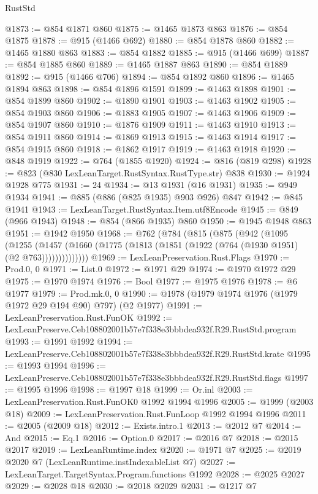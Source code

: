 \begin{lexlean}{RustStd}
\begin{coremodule}
@1873 := @854 @1871 @860
@1875 := @1465 @1873 @863
@1876 := @854 @1875
@1878 := @915 (@1466 @692)
@1880 := @854 @1878 @860
@1882 := @1465 @1880 @863
@1883 := @854 @1882
@1885 := @915 (@1466 @699)
@1887 := @854 @1885 @860
@1889 := @1465 @1887 @863
@1890 := @854 @1889
@1892 := @915 (@1466 @706)
@1894 := @854 @1892 @860
@1896 := @1465 @1894 @863
@1898 := @854 @1896 @1591
@1899 := @1463 @1898
@1901 := @854 @1899 @860
@1902 := @1890 @1901
@1903 := @1463 @1902
@1905 := @854 @1903 @860
@1906 := @1883 @1905
@1907 := @1463 @1906
@1909 := @854 @1907 @860
@1910 := @1876 @1909
@1911 := @1463 @1910
@1913 := @854 @1911 @860
@1914 := @1869 @1913
@1915 := @1463 @1914
@1917 := @854 @1915 @860
@1918 := @1862 @1917
@1919 := @1463 @1918
@1920 := @848 @1919
@1922 := @764 (@1855 @1920)
@1924 := @816 (@819 @298)
@1928 := @823 (@830 LexLeanTarget.RustSyntax.RustType.str) @838
@1930 := @1924 @1928 @775
@1931 := 24
@1934 := @13 @1931 (@16 @1931)
@1935 := @949 @1934
@1941 := @885 (@886 (@825 @1935) @903 @926) @847
@1942 := @845 @1941
@1943 := LexLeanTarget.RustSyntax.Item.utf8Encode
@1945 := @849 (@966 @1943)
@1948 := @854 (@866 @1935) @860
@1950 := @1945 @1948 @863
@1951 := @1942 @1950
@1968 := @762
    (@784
      (@815
        (@875
          (@942
            (@1095
              (@1255
                (@1457 (@1660 (@1775 (@1813 (@1851 (@1922 (@764 (@1930 @1951) (@2 @763))))))))))))))
@1969 := LexLeanPreservation.Rust.Flags
@1970 := Prod.{0, 0}
@1971 := List.{0}
@1972 := @1971 @29
@1974 := @1970 @1972 @29
@1975 := @1970 @1974
@1976 := Bool
@1977 := @1975 @1976
@1978 := @6 @1977
@1979 := Prod.mk.{0, 0}
@1990 := @1978 (@1979 @1974 @1976 (@1979 @1972 @29 @194 @90) @797) (@2 @1977)
@1991 := LexLeanPreservation.Rust.FunOK
@1992 := LexLeanPreserve.Ceb108802001b57e7f338e3bbbdea932f.R29.RustStd.program
@1993 := @1991 @1992
@1994 := LexLeanPreserve.Ceb108802001b57e7f338e3bbbdea932f.R29.RustStd.krate
@1995 := @1993 @1994
@1996 := LexLeanPreserve.Ceb108802001b57e7f338e3bbbdea932f.R29.RustStd.flags
@1997 := @1995 @1996
@1998 := @1997 @18
@1999 := Or.inl
@2003 := LexLeanPreservation.Rust.FunOK0 @1992 @1994 @1996
@2005 := @1999 (@2003 @18)
@2009 := LexLeanPreservation.Rust.FunLoop @1992 @1994 @1996
@2011 := @2005 (@2009 @18)
@2012 := Exists.intro.{1}
@2013 := @2012 @7
@2014 := And
@2015 := Eq.{1}
@2016 := Option.{0}
@2017 := @2016 @7
@2018 := @2015 @2017
@2019 := LexLeanRuntime.index
@2020 := @1971 @7
@2025 := @2019 @2020 @7 (LexLeanRuntime.instIndexableList @7)
@2027 := LexLeanTarget.TargetSyntax.Program.functions @1992
@2028 := @2025 @2027
@2029 := @2028 @18
@2030 := @2018 @2029
@2031 := @1217 @7

\end{coremodule}
\end{lexlean}

